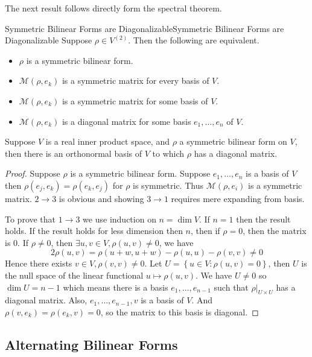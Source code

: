 \documentclass[../main.tex]{subfiles}
\begin{document}
The next result follows directly form the spectral theorem.
\begin{theorem}{Symmetric Bilinear Forms are Diagonalizable}{Symmetric Bilinear Forms are Diagonalizable}
Suppose $\rho\in V^{(2)}$. Then the following are equivalent.
\begin{itemize}
\item $\rho$ is a symmetric bilinear form.
\item $\mathscr{M}(\rho,e_k)$ is a symmetric matrix for every basis of $V$.
\item $\mathscr{M}(\rho,e_k)$ is a symmetric matrix for some basis of $V$.
\item $\mathscr{M}(\rho,e_k)$ is a diagonal matrix for some basis $e_1, \ldots ,e_n$ of $V$.
\end{itemize}

Suppose $V$ is a real inner product space, and $\rho$ a symmetric bilinear form on $V$, then there is an orthonormal basis of $V$ to which $\rho$ has a diagonal matrix.
\end{theorem}
\begin{proof}
Suppose $\rho$ is a symmetric bilinear form. Suppose $e_1, \ldots ,e_n$ is a basis of $V$ then $\rho(e_j,e_k)=\rho(e_k,e_j)$ for $\rho$ is symmetric. Thus $\mathscr{M}(\rho,e_i)$ is a symmetric matrix. $2 \rightarrow 3$ is obvious and showing $3 \rightarrow 1$ requires mere expanding from basis.

To prove that $1 \rightarrow 3$ we use induction on $n=\dim V$. If $n=1$ then the result holds. If the result holds for less dimension then $n$, then if $\rho=0$, then the matrix is $0$. If $\rho\neq 0$, then $\exists u,v\in V, \rho(u,v)\neq 0$, we have
\begin{equation*}
2 \rho(u,v) = \rho(u+w,u+w)-\rho(u,u)-\rho(v,v)\neq 0
\end{equation*}
Hence there exists $v\in V, \rho(v,v)\neq 0$. Let $U = \left\{ u\in V: \rho(u,v)=0 \right\}$, then $U$ is the null space of the linear functional $u \mapsto \rho(u,v)$. We have $U\neq 0$ so $\dim U = n-1$ which means there is a basis $e_1, \ldots ,e_{n-1}$ such that $\rho|_{U \times U}$ has a diagonal matrix. Also, $e_1, \ldots ,e_{n-1},v$ is a basis of $V$. And $\rho(v,e_k)=\rho(e_k,v)=0$, so the matrix to this basis is diagonal.
\end{proof}

\subsection{Alternating Bilinear Forms}
\end{document}
